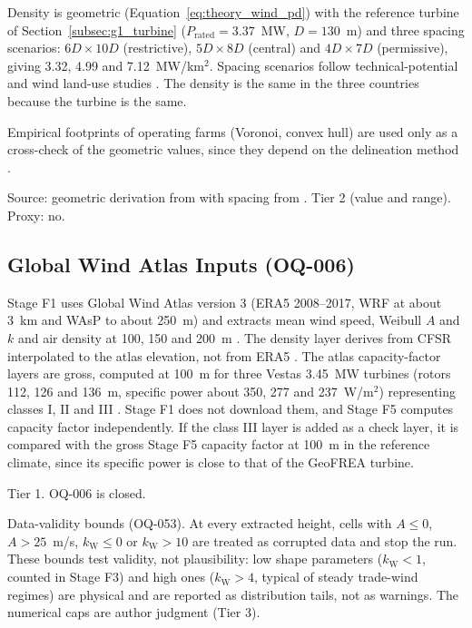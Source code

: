 Density is geometric (Equation~\ref{eq:theory_wind_pd}) with the
reference turbine of Section~\ref{subsec:g1_turbine}
($P_{\mathrm{rated}}=3.37$~MW, $D=130$~m) and three spacing scenarios:
$6D\times10D$ (restrictive), $5D\times8D$ (central) and $4D\times7D$
(permissive), giving 3.32, 4.99 and 7.12~MW/km$^2$. Spacing scenarios
follow technical-potential and wind land-use studies
\cite{lopez2012,harrisonatlas2022,turkovska2024}. The density is the
same in the three countries because the turbine is the same.

Empirical footprints of operating farms (Voronoi, convex hull) are used
only as a cross-check of the geometric values, since they depend on the
delineation method \cite{harrisonatlas2022,turkovska2021,turkovska2024}.

Source: geometric derivation from \cite{bortolotti2019} with spacing from
\cite{lopez2012,harrisonatlas2022}. Tier 2 (value and range). Proxy: no.

\subsection{Global Wind Atlas Inputs (OQ-006)}
\label{subsec:g1_gwa}

Stage F1 uses Global Wind Atlas version 3 (ERA5 2008--2017, WRF at about
3~km and WAsP to about 250~m) and extracts mean wind speed, Weibull $A$
and $k$ and air density at 100, 150 and 200~m
\cite{dtuwind2019gwa3release,gwaV3dataset}. The density layer derives
from CFSR interpolated to the atlas elevation, not from ERA5
\cite{gwaV3dataset}. The atlas capacity-factor layers are gross, computed
at 100~m for three Vestas 3.45~MW turbines (rotors 112, 126 and 136~m,
specific power about 350, 277 and 237~W/m$^2$) representing classes I,
II and III \cite{davis2023globalwindatlas}. Stage F1 does not download
them, and Stage F5 computes capacity factor independently. If the class
III layer is added as a check layer, it is compared with the gross
Stage F5 capacity factor at 100~m in the reference climate, since its
specific power is close to that of the GeoFREA turbine.

Tier 1. OQ-006 is closed.

Data-validity bounds (OQ-053). At every extracted height, cells with
$A\le 0$, $A>25$~m/s, $k_{\mathrm{W}}\le 0$ or $k_{\mathrm{W}}>10$ are
treated as corrupted data and stop the run. These bounds test validity,
not plausibility: low shape parameters ($k_{\mathrm{W}}<1$, counted in
Stage F3) and high ones ($k_{\mathrm{W}}>4$, typical of steady trade-wind
regimes) are physical and are reported as distribution tails, not as
warnings. The numerical caps are author judgment (Tier 3).

